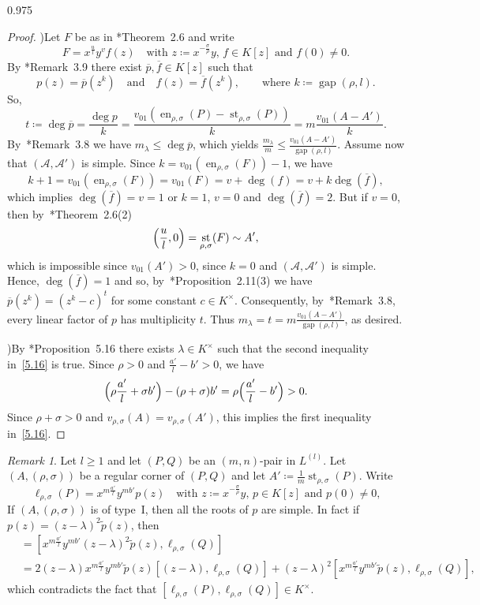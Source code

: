 \documentclass[reqno,a4paper,twoside]{amsart}
\theoremstyle{definition}
\theoremstyle{remark}
\newtheorem{remark}[theorem]{Remark}
\DeclareMathOperator{\gap}{gap}
\DeclareMathOperator{\en}{en}
\DeclareMathOperator{\st}{st}
\newcommand{\ov}{\overline}
\begin{document}
\begin{spacing}{0.975}
\begin{proof}
\smallskip

)\enspace Let $F$ be as in \cite{GGV1}*{Theorem~2.6} and write
$$
F = x^{\frac{u}{l}} y^v f(z)\quad\text{with $z\coloneqq x^{-\frac{\sigma}{\rho}}y$, $f\in K[z]$ and $f(0)\ne 0$.}
$$
By \cite{GGV2}*{Remark~3.9} there exist $\ov{p},\ov{f}\in K[z]$ such that
$$
p(z) = \ov{p}(z^k)\quad\text{and}\quad f(z) = \ov{f}(z^k),\qquad\text{where $k\coloneqq \gap(\rho,l)$.}
$$
So,
$$
t\coloneqq \deg \ov p= \frac{\deg p}{k} =\frac{v_{01}(\en_{\rho,\sigma}(P)-\st_{\rho,\sigma}(P))}{k}=m \frac{v_{01}(A-A')}{k}.
$$
By~\cite{GGV2}*{Remark~3.8} we have $m_{\lambda}\le \deg \ov{p}$, which yields $\frac{m_{\lambda}}{m}\le \frac{v_{01}(A-A')}{\gap(\rho,l)}$. Assume now that $(\mathcal{A},\mathcal{A}')$ is simple. Since $k = v_{01}(\en_{\rho,\sigma}(F))-1$, we have
$$
k+1 = v_{01}(\en_{\rho,\sigma}(F)) = v_{01}(F) = v + \deg(f) = v + k\deg(\ov{f}),
$$
which implies $\deg(\ov{f}) = v = 1$ or $k=1$, $v=0$ and $\deg(\ov{f}) = 2$. But if $v=0$, then by~\cite{GGV1}*{The\-orem~2.6(2)}
$$
\Bigl(\frac{u}{l},0\Bigr) = \st_{\rho,\sigma} (F) \sim A',
$$
which is impossible since $v_{01}(A')> 0$, since $k=0$ and $(\mathcal{A},\mathcal{A}')$ is simple. Hence, $\deg(\ov f)=1$ and so, by~\cite{GGV1}*{Proposition~2.11(3)} we have $\ov p(z^k)=(z^k-c)^t$ for some constant $c\in K^{\times}$. Consequently, by~\cite{GGV2}*{Remark~3.8}, every linear factor of $p$ has multiplicity $t$. Thus $m_{\lambda}=t=m\frac{v_{01}(A-A')}{\gap(\rho,l)}$, as desired.

\smallskip

)\enspace By \cite{GGV1}*{Proposition~5.16} there exists $\lambda\in K^{\times}$ such that the second inequality in~\eqref{5.16} is true. Since $\rho>0$ and $\frac{a'}{l}-b'>0$, we have
$$
\Bigl(\rho\frac{a'}{l} + \sigma b'\Bigr) - (\rho+\sigma)b' =  \rho \Bigl(\frac{a'}{l} - b'\Bigr) > 0.
$$
Since $\rho+\sigma>0$ and $v_{\rho,\sigma}(A) = v_{\rho,\sigma}(A')$, this implies the first inequality in~\eqref{5.16}.
\end{proof}

\begin{remark}\label{comentarios0} Let $l\ge 1$ and let $(P,Q)$ be an $(m,n)$-pair in $L^{(l)}$. Let $(A,(\rho,\sigma))$ be a regular corner  of $(P,Q)$ and let $A'\coloneqq \frac{1}{m}\st_{\rho,\sigma}(P)$. Write
$$
\ell_{\rho,\sigma}(P) = x^{m\frac{a'}{l}} y^{mb'} p(z)\quad\text{with $z\coloneqq x^{-\frac{\sigma}{\rho}}y$, $p\in K[z]$ and $p(0)\ne 0$,}
$$
If $(A,(\rho,\sigma))$ is of type~I, then all the roots of $p$ are simple. In fact if $p(z) = (z-\lambda)^2\tilde{p}(z)$, then
\begin{align*}
[\ell_{\rho,\sigma}(P),\ell_{\rho,\sigma}(Q)] & = [x^{m\frac{a'}{l}}y^{mb'}(z-\lambda)^2\tilde{p}(z) ,\ell_{\rho,\sigma}(Q)]\\
%
& = 2(z-\lambda)x^{m\frac{a'}{l}}y^{mb'}\tilde{p}(z) [(z-\lambda),\ell_{\rho,\sigma}(Q)] + (z-\lambda)^2[x^{m\frac{a'}{l}}y^{mb'}\tilde{p}(z) ,\ell_{\rho,\sigma}(Q)],
\end{align*}
which contradicts the fact that $[\ell_{\rho,\sigma}(P),\ell_{\rho,\sigma}(Q)]\in K^{\times}$.
\end{remark}


\end{spacing}
\end{document}
